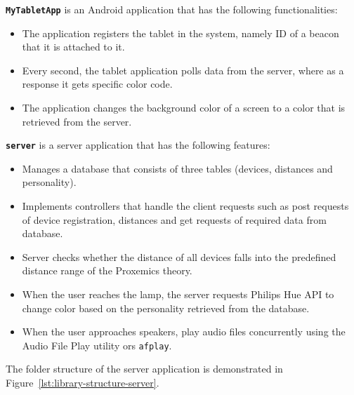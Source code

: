\textbf{\texttt{MyTabletApp}} is an Android application that has the following functionalities:
\begin{itemize}
    \item The application registers the tablet in the system, namely ID of a beacon that it is attached to it.
    \item Every second, the tablet application polls data from the server, where as a response it gets specific color code.
    \item The application changes the background color of a screen to a color that is retrieved from the server.
\end{itemize}

\textbf{\texttt{server}} is a server application that has the following features:
\begin{itemize}
    \item Manages a database that consists of three tables (devices, distances and personality).
    \item Implements controllers that handle the client requests such as post requests of device registration,
    distances and get requests of required data from database.
    \item Server checks whether the distance of all devices falls into the predefined distance range of the Proxemics theory.
    \item When the user reaches the lamp, the server requests Philips Hue API to change color based on the personality retrieved from the database.
    \item When the user approaches speakers, play audio files concurrently using the Audio File Play
    utility ors \texttt{afplay}.
\end{itemize}

The folder structure of the server application is demonstrated in Figure~\ref{lst:library-structure-server}.

